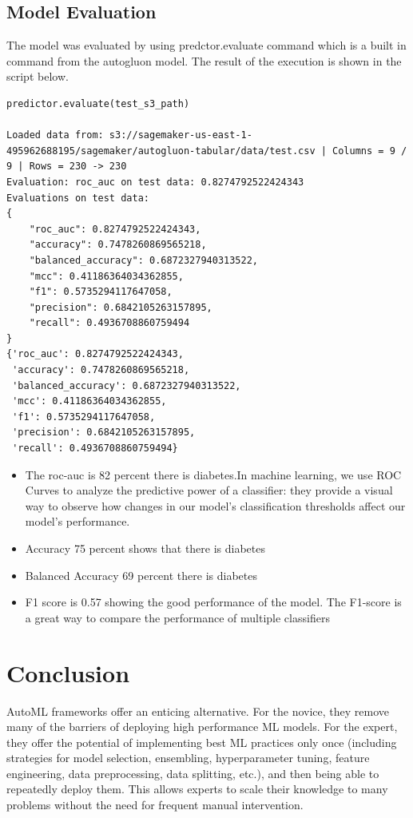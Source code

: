 \documentclass[
]{article}
\begin{document}
\hypertarget{model-evaluation}{%
\subsection{Model Evaluation}\label{model-evaluation}}

The model was evaluated by using predctor.evaluate command which is a
built in command from the autogluon model. The result of the execution
is shown in the script below.

\begin{verbatim}
predictor.evaluate(test_s3_path)

Loaded data from: s3://sagemaker-us-east-1-495962688195/sagemaker/autogluon-tabular/data/test.csv | Columns = 9 / 9 | Rows = 230 -> 230
Evaluation: roc_auc on test data: 0.8274792522424343
Evaluations on test data:
{
    "roc_auc": 0.8274792522424343,
    "accuracy": 0.7478260869565218,
    "balanced_accuracy": 0.6872327940313522,
    "mcc": 0.41186364034362855,
    "f1": 0.5735294117647058,
    "precision": 0.6842105263157895,
    "recall": 0.4936708860759494
}
{'roc_auc': 0.8274792522424343,
 'accuracy': 0.7478260869565218,
 'balanced_accuracy': 0.6872327940313522,
 'mcc': 0.41186364034362855,
 'f1': 0.5735294117647058,
 'precision': 0.6842105263157895,
 'recall': 0.4936708860759494}
\end{verbatim}

\begin{itemize}
\item
  The roc-auc is 82 percent there is diabetes.In machine learning, we
  use ROC Curves to analyze the predictive power of a classifier: they
  provide a visual way to observe how changes in our model's
  classification thresholds affect our model's performance.
\item
  Accuracy 75 percent shows that there is diabetes
\item
  Balanced Accuracy 69 percent there is diabetes
\item
  F1 score is 0.57 showing the good performance of the model. The
  F1-score is a great way to compare the performance of multiple
  classifiers
\end{itemize}

\hypertarget{conclusion}{%
\section{Conclusion}\label{conclusion}}

AutoML frameworks offer an enticing alternative. For the novice, they
remove many of the barriers of deploying high performance ML models. For
the expert, they offer the potential of implementing best ML practices
only once (including strategies for model selection, ensembling,
hyperparameter tuning, feature engineering, data preprocessing, data
splitting, etc.), and then being able to repeatedly deploy them. This
allows experts to scale their knowledge to many problems without the
need for frequent manual intervention.
\end{document}
